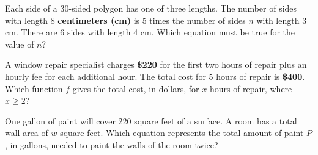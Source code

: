 \vspace{0.75em}


\newpage

\noindent\markforreview

\vspace{1em}

Each side of a 30-sided polygon has one of three lengths. The number of sides with length 8 \textbf{centimeters (cm)} is 5 times the number of sides \( n \) with length 3 cm. There are 6 sides with length 4 cm. Which equation must be true for the value of \( n \)?

\vspace{0.75em}


\vspace{2em}
\noindent\markforreview

\vspace{1em}

A window repair specialist charges \textbf{\$220} for the first two hours of repair plus an hourly fee for each additional hour. The total cost for 5 hours of repair is \textbf{\$400}. Which function \( f \) gives the total cost, in dollars, for \( x \) hours of repair, where \( x \geq 2 \)?

\vspace{0.75em}





\newpage
\noindent\markforreview

\vspace{1em}

One gallon of paint will cover 220 square feet of a surface. A room has a total wall area of \( w \) square feet. Which equation represents the total amount of paint \( P \), in gallons, needed to paint the walls of the room twice?

\vspace{0.75em}


\vspace{2em}

